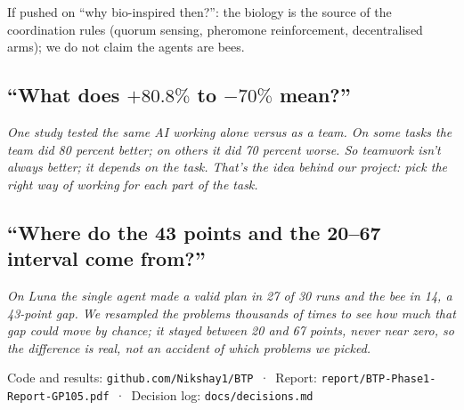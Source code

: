 \documentclass[11pt,a4paper]{article}
\newcommand{\say}[1]{\par\smallskip\noindent\colorbox{accent!10}{\parbox{\dimexpr\linewidth-2\fboxsep}{\small\itshape #1}}\par}
\begin{document}
If pushed on ``why bio-inspired then?'': the biology is the source of the coordination rules (quorum
sensing, pheromone reinforcement, decentralised arms); we do not claim the agents are bees.

\subsection*{``What does $+80.8\%$ to $-70\%$ mean?''}
\say{One study tested the same AI working alone versus as a team. On some tasks the team did 80 percent better;
on others it did 70 percent worse. So teamwork isn't always better; it depends on the task. That's the idea
behind our project: pick the right way of working for each part of the task.}

\subsection*{``Where do the 43 points and the 20--67 interval come from?''}
\say{On Luna the single agent made a valid plan in 27 of 30 runs and the bee in 14, a 43-point gap. We resampled
the problems thousands of times to see how much that gap could move by chance; it stayed between 20 and 67
points, never near zero, so the difference is real, not an accident of which problems we picked.}

\vfill
\small Code and results: \texttt{github.com/Nikshay1/BTP} \,·\, Report: \texttt{report/BTP-Phase1-Report-GP105.pdf}
\,·\, Decision log: \texttt{docs/decisions.md}
\end{document}
